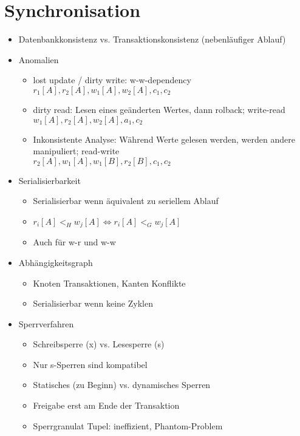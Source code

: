 \documentclass[11pt, paper=a4, twocolumn]{scrartcl}
\begin{document}
	\section{Synchronisation}
		\begin{itemize}
			\item Datenbankkonsistenz vs. Transaktionskonsistenz 
				(nebenläufiger Ablauf)
			\item Anomalien
				\begin{itemize}
					\item lost update / dirty write: w-w-dependency\\
						$r_1[A],r_2[A],w_1[A],w_2[A],c_1,c_2$
					\item dirty read: Lesen eines geänderten Wertes, 
						dann rolback; write-read\\
						$w_1[A],r_2[A],w_2[A],a_1,c_2$
					\item Inkonsistente Analyse: Während Werte gelesen 
						werden, werden andere manipuliert; 
						read-write\\
						$r_2[A],w_1[A],w_1[B],r_2[B],c_1,c_2$
				\end{itemize}
			\item Serialisierbarkeit
				\begin{itemize}
					\item Serialisierbar wenn äquivalent zu seriellem 
						Ablauf
					\item $r_i[A] <_H w_j[A] \Leftrightarrow 
						r_i[A] <_G w_j[A]$
					\item Auch für w-r und w-w
				\end{itemize}
			\item Abhängigkeitsgraph
				\begin{itemize}
					\item Knoten Transaktionen, Kanten Konflikte
					\item Serialisierbar wenn keine Zyklen
				\end{itemize}
			\item Sperrverfahren
				\begin{itemize}
					\item Schreibsperre (x) vs. Lesesperre (s)
					\item Nur s-Sperren sind kompatibel
					\item Statisches (zu Beginn) vs. dynamisches 
						Sperren
					\item Freigabe erst am Ende der Transaktion
					\item Sperrgranulat Tupel: ineffizient, 
						Phantom-Problem

\end{itemize}
\end{itemize}
\end{document}
